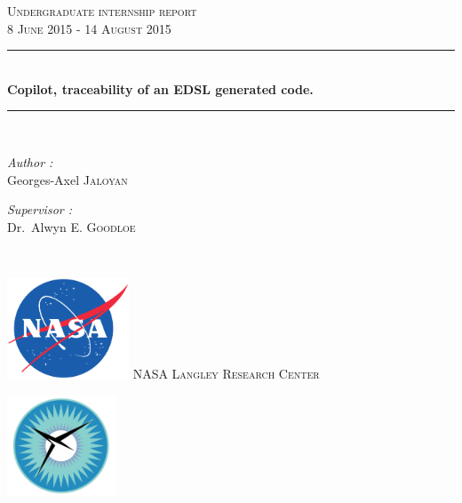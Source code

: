 \documentclass[a4paper,11pt,final]{article}
\newcommand{\reporttitle}{Copilot, traceability of an EDSL generated code.}     %
\newcommand{\reportauthor}{Georges-Axel \textsc{Jaloyan}} %
\newcommand{\reportsubject}{Undergraduate internship report\\[0.5cm]8 June 2015 - 14 August 2015} %
\newcommand{\HRule}{\rule{\linewidth}{0.5mm}}
\begin{document}
	
	\begin{titlepage}
		
		\begin{center}
			
			
			\textsc{\Large \reportsubject}\\[2.5cm]
			\HRule \\[0.4cm]
			{\huge \bfseries \reporttitle}\\[0.4cm]
			\HRule \\[2cm]
			
			\begin{minipage}[t]{0.3\textwidth}
				\begin{flushleft} \large
					\emph{Author :}\\
					\reportauthor
				\end{flushleft}
			\end{minipage}
			\begin{minipage}[t]{0.6\textwidth}
				\begin{flushright} \large
					\emph{Supervisor :} \\
					Dr.~Alwyn \textsc{E. Goodloe}
				\end{flushright}
			\end{minipage}
			\\[4cm]
			\begin{minipage}[t]{0.25\textwidth}
				\begin{flushleft}
					\includegraphics[height=30mm]{images/NASA.png}	
					\textsc{\LARGE NASA Langley Research Center}
				\end{flushleft}
			\end{minipage}
			\begin{minipage}[t]{0.25\textwidth}
				\begin{flushleft}
					\includegraphics[height=30mm]{images/NIA-logo.jpg}

\end{flushleft}
\end{minipage}
\end{center}
\end{titlepage}
\end{document}

